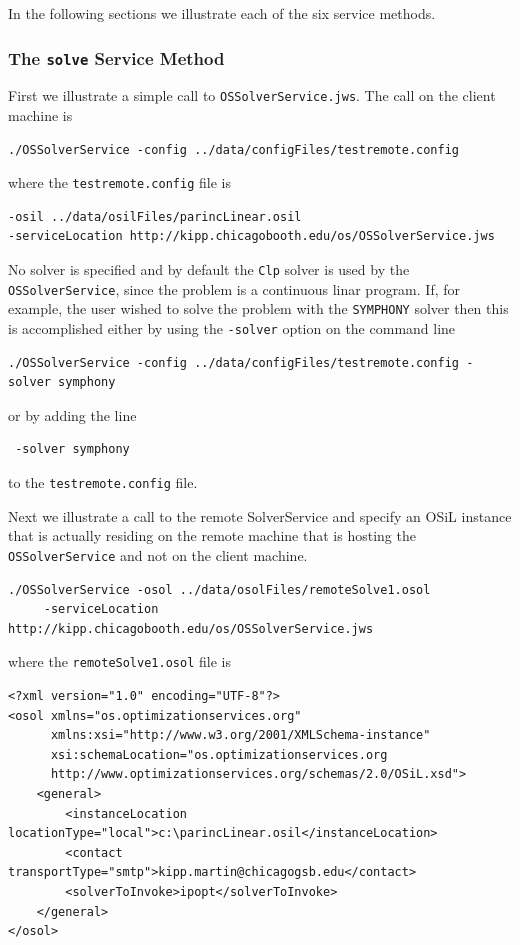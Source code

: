 \documentclass[11pt]{article}
\renewcommand{\_}{{\char"5F}}
\renewcommand{\{}{{\char"7B}}
\renewcommand{\}}{{\char"7D}}
\renewcommand{\^}{{\char"0D}}
\renewcommand{\'}{{\char"0D}}
\begin{document}
\begin{enumerate}[Step 1:]
In the following sections we illustrate each of the six service methods.

\subsubsection{The  {\tt solve} Service Method}\label{section:solve}

First we illustrate a simple call to  {\tt OSSolverService.jws}.  The call on the client machine is
\begin{verbatim}
./OSSolverService -config ../data/configFiles/testremote.config
\end{verbatim}
where the {\tt testremote.config} file is
\begin{verbatim}
-osil ../data/osilFiles/parincLinear.osil
-serviceLocation http://kipp.chicagobooth.edu/os/OSSolverService.jws
\end{verbatim}

No solver is specified and by default the  {\tt Clp} solver  is used by the {\tt OSSolverService}, 
since the problem is a continuous linar program.
If, for example, the user wished to solve the problem with the {\tt SYMPHONY} solver then this is accomplished
either by using the  {\tt -solver} option on the command line
\begin{verbatim}
./OSSolverService -config ../data/configFiles/testremote.config -solver symphony
\end{verbatim}
or by  adding  the line
\begin{verbatim}
 -solver symphony
\end{verbatim}
to the  {\tt testremote.config} file.

Next we illustrate a call to the remote SolverService and specify an OSiL instance that is actually residing
on the remote machine that is hosting the {\tt OSSolverService} and not on the client machine.
\begin{verbatim}
./OSSolverService -osol ../data/osolFiles/remoteSolve1.osol
     -serviceLocation  http://kipp.chicagobooth.edu/os/OSSolverService.jws
\end{verbatim}
where the {\tt remoteSolve1.osol} file is
\begin{verbatim}
<?xml version="1.0" encoding="UTF-8"?>
<osol xmlns="os.optimizationservices.org"
      xmlns:xsi="http://www.w3.org/2001/XMLSchema-instance"
      xsi:schemaLocation="os.optimizationservices.org
      http://www.optimizationservices.org/schemas/2.0/OSiL.xsd">
    <general>
        <instanceLocation locationType="local">c:\parincLinear.osil</instanceLocation>
        <contact transportType="smtp">kipp.martin@chicagogsb.edu</contact>
        <solverToInvoke>ipopt</solverToInvoke>      
    </general>
</osol>
\end{verbatim}


\end{enumerate}
\end{document}
